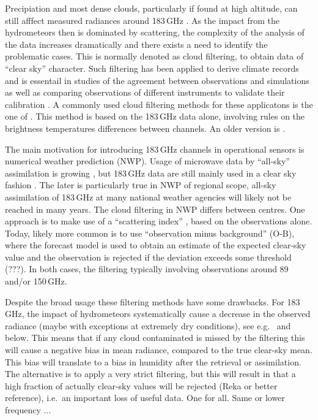 \documentclass[amt, manuscript]{copernicus}
\newcommand{\todo}[1]{{\color{red} #1}}
\begin{document}
Precipiation and most dense clouds, particularly if found at high altitude, can
still afffect measured radiances around 183\,GHz
\citep[e.g.][]{bennartz2003sensitivity}. As the impact from the hydrometeors
then is dominated by scattering, the complexity of the analysis of the data
increases dramatically and there exists a need to identify the problematic
cases. This is normally denoted as cloud filtering, to obtain data of ``clear
sky'' character. Such filtering has been applied to derive climate records
\citep{lang2020new} and is essentail in studies of the agreement between
observations and simulations \citep{brogniez2016review} as well as 
comparing observations of different instruments to validate their calibration
\citep{john2013assessment,moradi:retri:15,berg2016intercalibration}. A commonly
used cloud filtering methods for these applicatons is the one of
\citet{buehler:aclou:07}. This method is based on the 183\,GHz data alone,
involving rules on the brightness temperatures differences between channels. An
older version is \citet{burns1997effects}.

The main motivation for introducing 183\,GHz channels in operational sensors is
numerical weather prediction (NWP). Usage of microwave data by ``all-sky''
assimilation is growing \citep{geer2017growing}, but 183\,GHz data are still
mainly used in a clear sky fashion \citep{geer2018all}. The later is
particularly true in NWP of regional scope, all-sky assimilation of 183\,GHz at
many national weather agencies will likely not be reached in many years. The
cloud filtering in NWP differs between centres. One approach is to make use of
a ``scattering index'' \citep{bennartz2002precipitation}, based on the
observations alone. Today, likely more common is to use ``observation minus
background'' (O-B), where the forecast model is used to obtain an estimate of
the expected clear-sky value and the observation is rejected if the deviation
exceeds some threshold (???). In both cases, the filtering typically involving
observations around 89 and/or 150\,GHz.

Despite the broad usage these filtering methods have some drawbacks. For
183\,GHz, the impact of hydrometeors systematically cause a decrease in the
observed radiance (maybe with exceptions at extremely dry conditions), see
e.g.\ \citet{barlakas:three:20} and below. This means that if any cloud
contaminated is missed by the filtering this will cause a negative bias in mean
radiance, compared to the true clear-sky mean. This bias will translate to
a bias in humidity after the retrieval or assimilation. The alternative is to
apply a very strict filtering, but this will result in that a high fraction of
actually clear-sky values will be rejected \todo{(Reka or better reference)},
i.e.\ an important loss of useful data. One for all. Same or lower frequency ...
\end{document}
